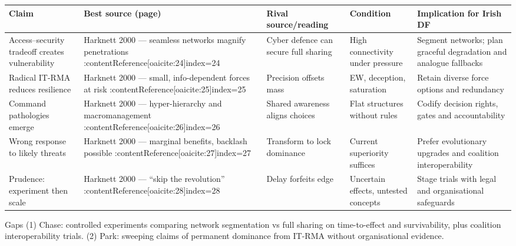 \begin{tabular}{p{3.2cm}p{4.2cm}p{3.6cm}p{3.2cm}p{4.2cm}}
	\textbf{Claim} & \textbf{Best source (page)} & \textbf{Rival source/reading} & \textbf{Condition} & \textbf{Implication for Irish DF}\\\hline
	Access–security tradeoff creates vulnerability & Harknett 2000 — seamless networks magnify penetrations {\small :contentReference[oaicite:24]{index=24}} & Cyber defence can secure full sharing & High connectivity under pressure & Segment networks; plan graceful degradation and analogue fallbacks \\
	Radical IT-RMA reduces resilience & Harknett 2000 — small, info-dependent forces at risk {\small :contentReference[oaicite:25]{index=25}} & Precision offsets mass & EW, deception, saturation & Retain diverse force options and redundancy \\
	Command pathologies emerge & Harknett 2000 — hyper-hierarchy and macromanagement {\small :contentReference[oaicite:26]{index=26}} & Shared awareness aligns choices & Flat structures without rules & Codify decision rights, gates and accountability \\
	Wrong response to likely threats & Harknett 2000 — marginal benefits, backlash possible {\small :contentReference[oaicite:27]{index=27}} & Transform to lock dominance & Current superiority suffices & Prefer evolutionary upgrades and coalition interoperability \\
	Prudence: experiment then scale & Harknett 2000 — “skip the revolution” {\small :contentReference[oaicite:28]{index=28}} & Delay forfeits edge & Uncertain effects, untested concepts & Stage trials with legal and organisational safeguards \\\hline
\end{tabular}

Gaps
(1) Chase: controlled experiments comparing network segmentation vs full sharing on time-to-effect and survivability, plus coalition interoperability trials.
(2) Park: sweeping claims of permanent dominance from IT-RMA without organisational evidence.

\parencite{JORD_2003}

